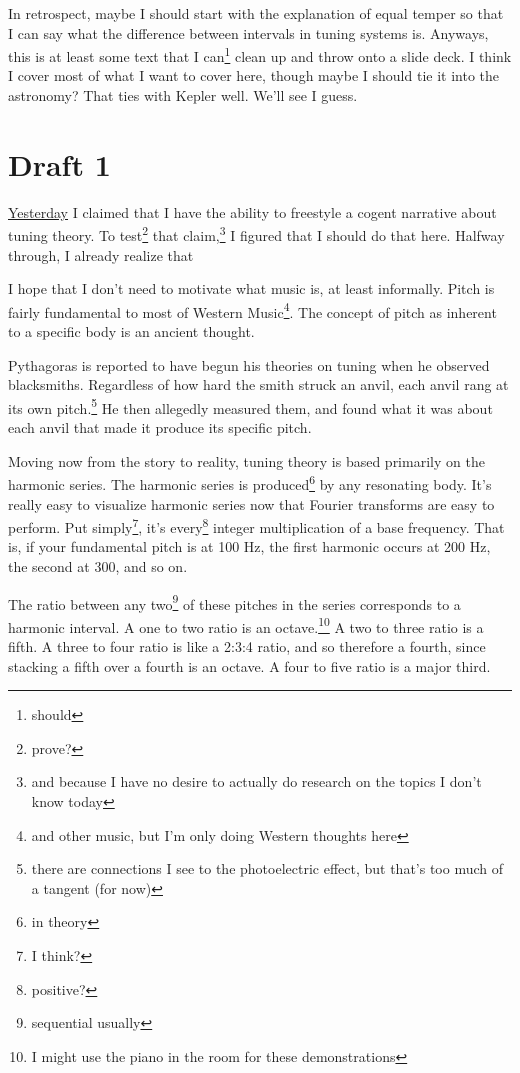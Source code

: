 \documentclass[12pt]{article}[titlepage]
\newcommand{\1}{\={a}}
\newcommand{\2}{\={e}}
\newcommand{\3}{\={\i}}
\newcommand{\4}{\=o}
\newcommand{\5}{\=u}
\newcommand{\6}{\={A}}
\renewcommand{\,}{\textsuperscript{,}}
\begin{document}
In retrospect, maybe I should start with the explanation of equal temper so that I can say what the difference between intervals in tuning systems is.
Anyways, this is at least some text that I can\footnote{should} clean up and throw onto a slide deck.
I think I cover most of what I want to cover here, though maybe I should tie it into the astronomy?
That ties with Kepler well.
We'll see I guess.

\section{Draft 1}
\href{talk-planning-1.html}{Yesterday} I claimed that I have the ability to freestyle a cogent narrative about tuning theory.
To test\footnote{prove?} that claim,\footnote{and because I have no desire to actually do research on the topics I don't know today} I figured that I should do that here.
Halfway through, I already realize that 

I hope that I don't need to motivate what music is, at least informally.
Pitch is fairly fundamental to most of Western Music\footnote{and other music, but I'm only doing Western thoughts here}.
The concept of pitch as inherent to a specific body is an ancient thought.

Pythagoras is reported to have begun his theories on tuning when he observed blacksmiths.
Regardless of how hard the smith struck an anvil, each anvil rang at its own pitch.\footnote{there are connections I see to the photoelectric effect, but that's too much of a tangent (for now)}
He then allegedly measured them, and found what it was about each anvil that made it produce its specific pitch.

Moving now from the story to reality, tuning theory is based primarily on the harmonic series.
The harmonic series is produced\footnote{in theory} by any resonating body.
It's really easy to visualize harmonic series now that Fourier transforms are easy to perform.
Put simply\footnote{I think?}, it's every\footnote{positive?} integer multiplication of a base frequency.
That is, if your fundamental pitch is at 100 Hz, the first harmonic occurs at 200 Hz, the second at 300, and so on.

The ratio between any two\footnote{sequential usually} of these pitches in the series corresponds to a harmonic interval.
A one to two ratio is an octave.\footnote{I might use the piano in the room for these demonstrations}
A two to three ratio is a fifth.
A three to four ratio is like a 2:3:4 ratio, and so therefore a fourth, since stacking a fifth over a fourth is an octave.
A four to five ratio is a major third.
\end{document}
